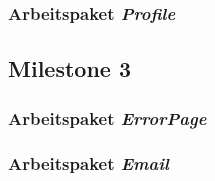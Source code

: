 \subsubsection{Arbeitspaket \emph{Profile}}

\subsection{Milestone 3}\label{subsec:milestone3}

\subsubsection{Arbeitspaket \emph{ErrorPage}}

\subsubsection{Arbeitspaket \emph{Email}}
